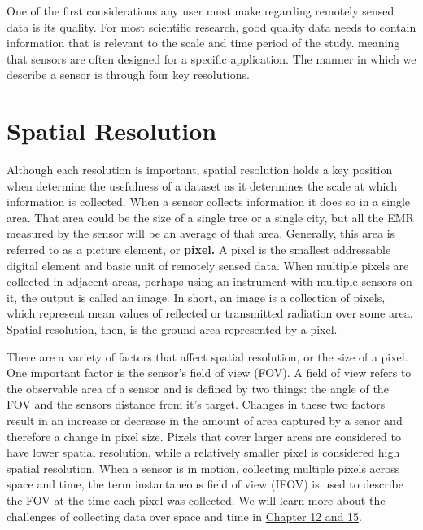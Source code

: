 \documentclass[
]{book}
\begin{document}
One of the first considerations any user must make regarding remotely
sensed data is its quality. For most scientific research, good quality
data needs to contain information that is relevant to the scale and time
period of the study. meaning that sensors are often designed for a
specific application. The manner in which we describe a sensor is
through four key resolutions.

\hypertarget{spatial-resolution}{%
\section{Spatial Resolution}\label{spatial-resolution}}

Although each resolution is important, spatial resolution holds a key
position when determine the usefulness of a dataset as it determines the
scale at which information is collected. When a sensor collects
information it does so in a single area. That area could be the size of
a single tree or a single city, but all the EMR measured by the sensor
will be an average of that area. Generally, this area is referred to as
a picture element, or \textbf{pixel.} A pixel is the smallest addressable
digital element and basic unit of remotely sensed data. When multiple
pixels are collected in adjacent areas, perhaps using an instrument with
multiple sensors on it, the output is called an image. In short, an
image is a collection of pixels, which represent mean values of
reflected or transmitted radiation over some area. Spatial
resolution, then, is the ground area represented by a pixel.

There are a variety of factors that affect spatial resolution, or the
size of a pixel. One important factor is the sensor's field of view
(FOV). A field of view refers to the observable area of a sensor and is
defined by two things: the angle of the FOV and the sensors distance
from it's target. Changes in these two factors result in an increase or
decrease in the amount of area captured by a senor and therefore a
change in pixel size. Pixels that cover larger areas are considered to
have lower spatial resolution, while a relatively smaller pixel is
considered high spatial resolution. When a sensor is in motion,
collecting multiple pixels across space and time, the term instantaneous
field of view (IFOV) is used to describe the FOV at the time each pixel
was collected. We will learn more about the challenges of collecting
data over space and time in \href{https://ubc-geomatics-textbook.github.io/geomatics-textbook/remote-sensing-systems.html,https://ubc-geomatics-textbook.github.io/geomatics-textbook/LiDAR-acquisition-and-analysis.html}{Chapter 12 and 15}.
\end{document}
